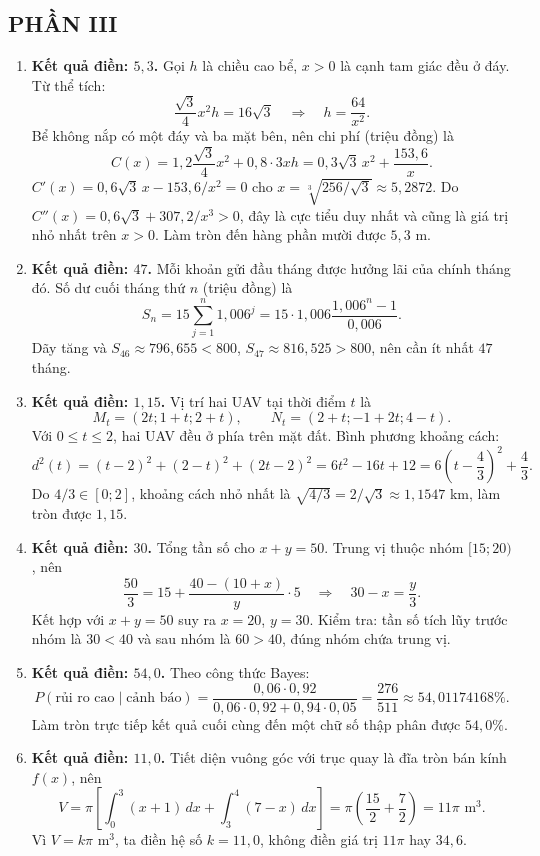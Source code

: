 \documentclass[12pt,a4paper]{article}
\begin{document}
\subsection*{PHẦN III}
\begin{enumerate}[label=\textbf{Câu \arabic*:}, leftmargin=*]
\item \textbf{Kết quả điền: $5{,}3$.} Gọi $h$ là chiều cao bể, $x>0$ là cạnh tam giác đều ở đáy. Từ thể tích:
\[
\frac{\sqrt3}{4}x^2h=16\sqrt3\quad\Longrightarrow\quad h=\frac{64}{x^2}.
\]
Bể không nắp có một đáy và ba mặt bên, nên chi phí (triệu đồng) là
\[
C(x)=1{,}2\frac{\sqrt3}{4}x^2+0{,}8\cdot3xh
 =0{,}3\sqrt3\,x^2+\frac{153{,}6}{x}.
\]
$C'(x)=0{,}6\sqrt3\,x-153{,}6/x^2=0$ cho $x=\sqrt[3]{256/\sqrt3}\approx5{,}2872$. Do $C''(x)=0{,}6\sqrt3+307{,}2/x^3>0$, đây là cực tiểu duy nhất và cũng là giá trị nhỏ nhất trên $x>0$. Làm tròn đến hàng phần mười được $5{,}3$ m.
\item \textbf{Kết quả điền: $47$.} Mỗi khoản gửi đầu tháng được hưởng lãi của chính tháng đó. Số dư cuối tháng thứ $n$ (triệu đồng) là
\[
S_n=15\sum_{j=1}^n1{,}006^j
 =15\cdot1{,}006\frac{1{,}006^n-1}{0{,}006}.
\]
Dãy tăng và $S_{46}\approx796{,}655<800$, $S_{47}\approx816{,}525>800$, nên cần ít nhất $47$ tháng.
\item \textbf{Kết quả điền: $1{,}15$.} Vị trí hai UAV tại thời điểm $t$ là
\[
M_t=(2t;1+t;2+t),\qquad N_t=(2+t;-1+2t;4-t).
\]
Với $0\le t\le2$, hai UAV đều ở phía trên mặt đất. Bình phương khoảng cách:
\[
d^2(t)=(t-2)^2+(2-t)^2+(2t-2)^2
 =6t^2-16t+12=6\left(t-\frac43\right)^2+\frac43.
\]
Do $4/3\in[0;2]$, khoảng cách nhỏ nhất là $\sqrt{4/3}=2/\sqrt3\approx1{,}1547$ km, làm tròn được $1{,}15$.
\item \textbf{Kết quả điền: $30$.} Tổng tần số cho $x+y=50$. Trung vị thuộc nhóm $[15;20)$, nên
\[
\frac{50}{3}=15+\frac{40-(10+x)}{y}\cdot5
 \quad\Longrightarrow\quad 30-x=\frac y3.
\]
Kết hợp với $x+y=50$ suy ra $x=20$, $y=30$. Kiểm tra: tần số tích lũy trước nhóm là $30<40$ và sau nhóm là $60>40$, đúng nhóm chứa trung vị.
\item \textbf{Kết quả điền: $54{,}0$.} Theo công thức Bayes:
\[
P(\text{rủi ro cao}\mid\text{cảnh báo})
 =\frac{0{,}06\cdot0{,}92}{0{,}06\cdot0{,}92+0{,}94\cdot0{,}05}
 =\frac{276}{511}\approx54{,}01174168\%.
\]
Làm tròn trực tiếp kết quả cuối cùng đến một chữ số thập phân được $54{,}0\%$.
\item \textbf{Kết quả điền: $11{,}0$.} Tiết diện vuông góc với trục quay là đĩa tròn bán kính $f(x)$, nên
\[
V=\pi\left[\int_0^3(x+1)\,dx+\int_3^4(7-x)\,dx\right]
 =\pi\left(\frac{15}{2}+\frac72\right)=11\pi\text{ m}^3.
\]
Vì $V=k\pi\text{ m}^3$, ta điền hệ số $k=11{,}0$, không điền giá trị $11\pi$ hay $34{,}6$.
\end{enumerate}
\end{document}
